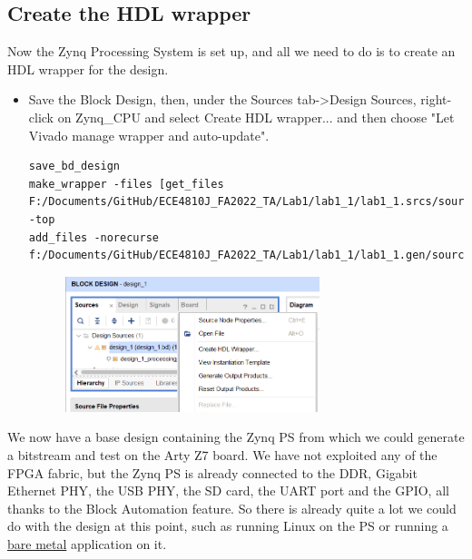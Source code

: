 \documentclass[a4paper,12pt,twoside]{article}
\begin{document}
\subsection{Create the HDL wrapper}
Now the Zynq Processing System is set up, and all we need to do is to create an HDL wrapper for the design.
\begin{itemize}
    \item Save the Block Design, then, under the Sources tab->Design Sources, right-click on Zynq\_CPU and select Create HDL wrapper... and then choose "Let Vivado manage wrapper and auto-update".
    \begin{verbatim}
save_bd_design
make_wrapper -files [get_files F:/Documents/GitHub/ECE4810J_FA2022_TA/Lab1/lab1_1/lab1_1.srcs/sources_1/bd/Zynq_CPU/Zynq_CPU.bd] -top
add_files -norecurse f:/Documents/GitHub/ECE4810J_FA2022_TA/Lab1/lab1_1/lab1_1.gen/sources_1/bd/Zynq_CPU/hdl/Zynq_CPU_wrapper.v
    \end{verbatim}
    \begin{figure}[H]
        \centering
        \includegraphics[width=0.7\textwidth]{images/6.png}
    \end{figure}
\end{itemize}
We now have a base design containing the Zynq PS from which we could generate a bitstream and test on the Arty Z7 board. We have not exploited any of the FPGA fabric, but the Zynq PS is already connected to the DDR, Gigabit Ethernet PHY, the USB PHY, the SD card, the UART port and the GPIO, all thanks to the Block Automation feature. So there is already quite a lot we could do with the design at this point, such as running Linux on the PS or running a \underline{bare metal} application on it.
\end{document}

